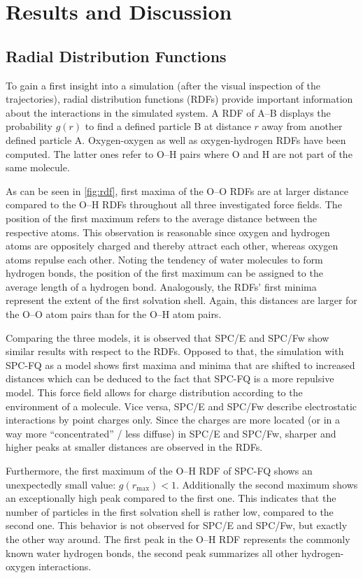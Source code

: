 \documentclass[a4paper,12pt]{scrartcl}
\newcommand{\m}[1]{\mathrm{#1}}
\begin{document}
\section{Results and Discussion}		
%	
	\subsection{Radial Distribution Functions}
		To gain a first insight into a simulation (after the visual inspection of the trajectories), radial distribution functions (RDFs) provide important information about the interactions in the simulated system. A RDF of A--B displays the probability $ g(r) $ to find a defined particle B at distance $ r $ away from another defined particle A. Oxygen-oxygen as well as oxygen-hydrogen RDFs have been computed. The latter ones refer to O--H pairs where O and H are not part of the same molecule. 
		
		As can be seen in \autoref{fig:rdf}, first maxima of the O--O RDFs are at larger distance compared to the O--H RDFs throughout all three investigated force fields. The position of the first maximum refers to the average distance between the respective atoms. This observation  is reasonable since oxygen and hydrogen atoms are oppositely charged and thereby attract each other, whereas oxygen atoms repulse each other. Noting the tendency of water molecules to form hydrogen bonds, the position of the first maximum can be assigned to the average length of a hydrogen bond. Analogously, the RDFs' first minima represent the extent of the first solvation shell. Again, this distances are larger for the O--O atom pairs than for the O--H atom pairs.
		
		Comparing the three models, it is observed that SPC/E and SPC/Fw show similar results with respect to the RDFs. Opposed to that, the simulation with SPC-FQ as a model shows first maxima and minima that are shifted to increased distances which can be deduced to the fact that SPC-FQ is a more repulsive model. This force field allows for charge distribution according to the environment of a molecule. Vice versa, SPC/E and SPC/Fw describe electrostatic interactions by point charges only. Since the charges are more located (or in a way more \enquote{concentrated} / less diffuse) in SPC/E and SPC/Fw, sharper and higher peaks at smaller distances are observed in the RDFs.
		
		Furthermore, the first maximum of the O--H RDF of SPC-FQ shows an unexpectedly small value: $ g(r_\m{max}) < 1 $. Additionally the second maximum shows an exceptionally high peak compared to the first one. This indicates that the number of particles in the first solvation shell is rather low, compared to the second one. This behavior is not observed for SPC/E and SPC/Fw, but exactly the other way around. The first peak in the O--H RDF represents the commonly known water hydrogen bonds, the second peak summarizes all other hydrogen-oxygen interactions.
		
\end{document}
